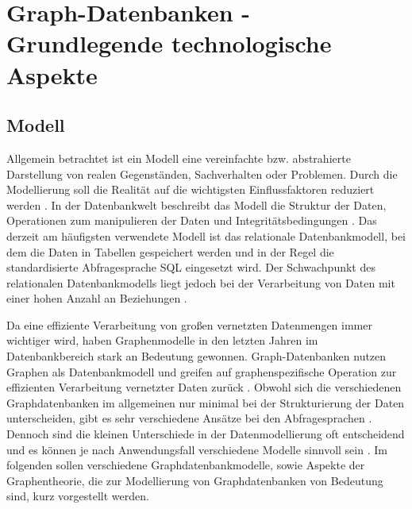 \chapter{Graph-Datenbanken - Grundlegende technologische Aspekte}
\section{Modell}
Allgemein betrachtet ist ein Modell eine vereinfachte bzw. abstrahierte Darstellung von realen Gegenständen, Sachverhalten oder Problemen.
Durch die Modellierung soll die Realität auf die wichtigsten Einflussfaktoren reduziert werden \cite{datamodels}.
In der Datenbankwelt beschreibt das Modell die Struktur der Daten, Operationen zum manipulieren der Daten und Integritätsbedingungen \cite{efcodd}.
Das derzeit am häufigsten verwendete Modell ist das relationale Datenbankmodell, bei dem die Daten in Tabellen gespeichert werden und in der Regel die standardisierte Abfragesprache \ac{SQL} eingesetzt wird.
Der Schwachpunkt des relationalen Datenbankmodells liegt jedoch bei der Verarbeitung von Daten mit einer hohen Anzahl an Beziehungen \cite{vicknair2010comparison}.

Da eine effiziente Verarbeitung von großen vernetzten Datenmengen immer wichtiger wird, haben Graphenmodelle in den letzten Jahren im Datenbankbereich stark an Bedeutung gewonnen.
Graph-Datenbanken nutzen Graphen als Datenbankmodell und greifen auf graphenspezifische Operation zur effizienten Verarbeitung vernetzter Daten zurück \cite{angles2008survey}.
Obwohl sich die verschiedenen Graphdatenbanken im allgemeinen nur minimal bei der Strukturierung der Daten unterscheiden, gibt es sehr verschiedene Ansätze bei den Abfragesprachen \cite{anglesintro}.
Dennoch sind die kleinen Unterschiede in der Datenmodellierung oft entscheidend und es können je nach Anwendungsfall verschiedene Modelle sinnvoll sein \cite{angles2012comparison}.
Im folgenden sollen verschiedene Graphdatenbankmodelle, sowie Aspekte der Graphentheorie, die zur Modellierung von Graphdatenbanken von Bedeutung sind, kurz vorgestellt werden.
